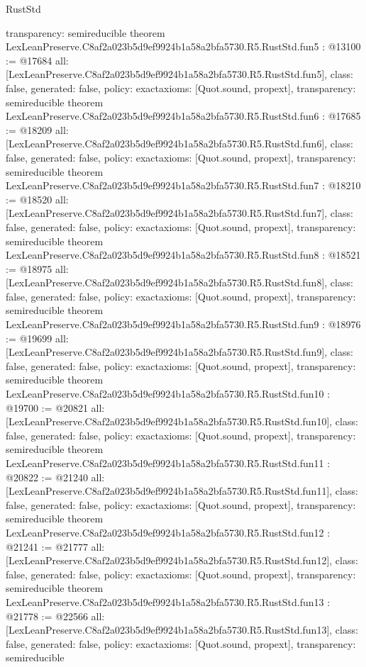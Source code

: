 \begin{lexlean}{RustStd}
\begin{coremodule}
{  transparency: semireducible
}
theorem LexLeanPreserve.C8af2a023b5d9ef9924b1a58a2bfa5730.R5.RustStd.fun5 : @13100 := @17684 {
  all: [LexLeanPreserve.C8af2a023b5d9ef9924b1a58a2bfa5730.R5.RustStd.fun5],
  class: false,
  generated: false,
  policy: exact{axioms: [Quot.sound, propext]},
  transparency: semireducible
}
theorem LexLeanPreserve.C8af2a023b5d9ef9924b1a58a2bfa5730.R5.RustStd.fun6 : @17685 := @18209 {
  all: [LexLeanPreserve.C8af2a023b5d9ef9924b1a58a2bfa5730.R5.RustStd.fun6],
  class: false,
  generated: false,
  policy: exact{axioms: [Quot.sound, propext]},
  transparency: semireducible
}
theorem LexLeanPreserve.C8af2a023b5d9ef9924b1a58a2bfa5730.R5.RustStd.fun7 : @18210 := @18520 {
  all: [LexLeanPreserve.C8af2a023b5d9ef9924b1a58a2bfa5730.R5.RustStd.fun7],
  class: false,
  generated: false,
  policy: exact{axioms: [Quot.sound, propext]},
  transparency: semireducible
}
theorem LexLeanPreserve.C8af2a023b5d9ef9924b1a58a2bfa5730.R5.RustStd.fun8 : @18521 := @18975 {
  all: [LexLeanPreserve.C8af2a023b5d9ef9924b1a58a2bfa5730.R5.RustStd.fun8],
  class: false,
  generated: false,
  policy: exact{axioms: [Quot.sound, propext]},
  transparency: semireducible
}
theorem LexLeanPreserve.C8af2a023b5d9ef9924b1a58a2bfa5730.R5.RustStd.fun9 : @18976 := @19699 {
  all: [LexLeanPreserve.C8af2a023b5d9ef9924b1a58a2bfa5730.R5.RustStd.fun9],
  class: false,
  generated: false,
  policy: exact{axioms: [Quot.sound, propext]},
  transparency: semireducible
}
theorem LexLeanPreserve.C8af2a023b5d9ef9924b1a58a2bfa5730.R5.RustStd.fun10 : @19700 := @20821 {
  all: [LexLeanPreserve.C8af2a023b5d9ef9924b1a58a2bfa5730.R5.RustStd.fun10],
  class: false,
  generated: false,
  policy: exact{axioms: [Quot.sound, propext]},
  transparency: semireducible
}
theorem LexLeanPreserve.C8af2a023b5d9ef9924b1a58a2bfa5730.R5.RustStd.fun11 : @20822 := @21240 {
  all: [LexLeanPreserve.C8af2a023b5d9ef9924b1a58a2bfa5730.R5.RustStd.fun11],
  class: false,
  generated: false,
  policy: exact{axioms: [Quot.sound, propext]},
  transparency: semireducible
}
theorem LexLeanPreserve.C8af2a023b5d9ef9924b1a58a2bfa5730.R5.RustStd.fun12 : @21241 := @21777 {
  all: [LexLeanPreserve.C8af2a023b5d9ef9924b1a58a2bfa5730.R5.RustStd.fun12],
  class: false,
  generated: false,
  policy: exact{axioms: [Quot.sound, propext]},
  transparency: semireducible
}
theorem LexLeanPreserve.C8af2a023b5d9ef9924b1a58a2bfa5730.R5.RustStd.fun13 : @21778 := @22566 {
  all: [LexLeanPreserve.C8af2a023b5d9ef9924b1a58a2bfa5730.R5.RustStd.fun13],
  class: false,
  generated: false,
  policy: exact{axioms: [Quot.sound, propext]},
  transparency: semireducible
}
\end{coremodule}
\end{lexlean}
